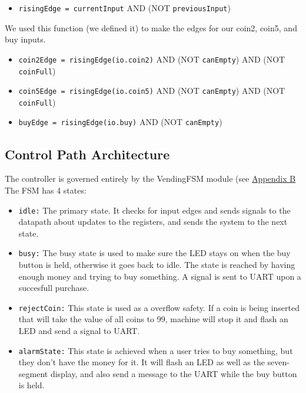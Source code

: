 \begin{itemize}
    \item \texttt{risingEdge = currentInput} AND (NOT \texttt{previousInput})
\end{itemize}
We used this function (we defined it) to make the edges for our coin2, coin5, and buy inputs.

\begin{itemize}
    \item \texttt{coin2Edge = risingEdge(io.coin2)} AND (NOT \texttt{canEmpty}) AND (NOT \texttt{coinFull})
    \item \texttt{coin5Edge = risingEdge(io.coin5)} AND (NOT \texttt{canEmpty}) AND (NOT \texttt{coinFull})
    \item \texttt{buyEdge = risingEdge(io.buy)} AND (NOT \texttt{canEmpty})
\end{itemize}

\subsection{Control Path Architecture}
The controller is governed entirely by the VendingFSM module (see \hyperref[sec:app_fsm]{Appendix B}
The FSM has 4 states: 
\begin{itemize}
    \item \texttt{idle:} The primary state. It checks for input edges and sends signals to the datapath about updates to the registers, and sends the system to the next state.
    \item \texttt{busy:} The busy state is used to make sure the LED stays on when the buy button is held, otherwise it goes back to idle. The state is reached by having enough money and trying to buy something. A signal is sent to UART upon a succesfull purchase.
    \item \texttt{rejectCoin:} This state is used as a overflow safety. If a coin is being inserted that will take the value of all coins to 99, machine will stop it and flash an LED and send a signal to UART.
    \item \texttt{alarmState:} This state is achieved when a user tries to buy something, but they don't have the money for it. It will flash an LED as well as the seven-segment display, and also send a message to the UART while the buy button is held.
\end{itemize}

